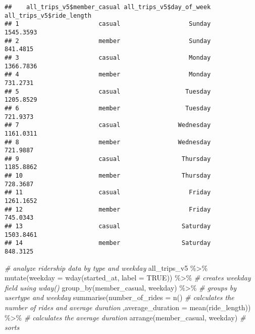 \documentclass[
]{article}
\newenvironment{Shaded}{\begin{snugshade}}{\end{snugshade}}
\newcommand{\AttributeTok}[1]{\textcolor[rgb]{0.77,0.63,0.00}{#1}}
\newcommand{\CommentTok}[1]{\textcolor[rgb]{0.56,0.35,0.01}{\textit{#1}}}
\newcommand{\ConstantTok}[1]{\textcolor[rgb]{0.00,0.00,0.00}{#1}}
\newcommand{\FunctionTok}[1]{\textcolor[rgb]{0.00,0.00,0.00}{#1}}
\newcommand{\NormalTok}[1]{#1}
\newcommand{\SpecialCharTok}[1]{\textcolor[rgb]{0.00,0.00,0.00}{#1}}
\begin{document}
\begin{verbatim}
##    all_trips_v5$member_casual all_trips_v5$day_of_week all_trips_v5$ride_length
## 1                      casual                   Sunday                1545.3593
## 2                      member                   Sunday                 841.4815
## 3                      casual                   Monday                1366.7836
## 4                      member                   Monday                 731.2731
## 5                      casual                  Tuesday                1205.8529
## 6                      member                  Tuesday                 721.9373
## 7                      casual                Wednesday                1161.0311
## 8                      member                Wednesday                 721.9887
## 9                      casual                 Thursday                1185.8862
## 10                     member                 Thursday                 728.3687
## 11                     casual                   Friday                1261.1652
## 12                     member                   Friday                 745.0343
## 13                     casual                 Saturday                1503.8461
## 14                     member                 Saturday                 848.3125
\end{verbatim}

\begin{Shaded}
\begin{Highlighting}[]
\CommentTok{\# analyze ridership data by type and weekday}
\NormalTok{all\_trips\_v5 }\SpecialCharTok{\%\textgreater{}\%} 
  \FunctionTok{mutate}\NormalTok{(}\AttributeTok{weekday =} \FunctionTok{wday}\NormalTok{(started\_at, }\AttributeTok{label =} \ConstantTok{TRUE}\NormalTok{)) }\SpecialCharTok{\%\textgreater{}\%}    \CommentTok{\# creates weekday field using wday()}
  \FunctionTok{group\_by}\NormalTok{(member\_casual, weekday) }\SpecialCharTok{\%\textgreater{}\%}                    \CommentTok{\# groups by usertype and weekday}
  \FunctionTok{summarise}\NormalTok{(}\AttributeTok{number\_of\_rides =} \FunctionTok{n}\NormalTok{()                         }\CommentTok{\# calculates the number of rides and average duration}
\NormalTok{            ,}\AttributeTok{average\_duration =} \FunctionTok{mean}\NormalTok{(ride\_length)) }\SpecialCharTok{\%\textgreater{}\%}    \CommentTok{\# calculates the average duration}
  \FunctionTok{arrange}\NormalTok{(member\_casual, weekday)                         }\CommentTok{\# sorts}
\end{Highlighting}
\end{Shaded}
\end{document}
